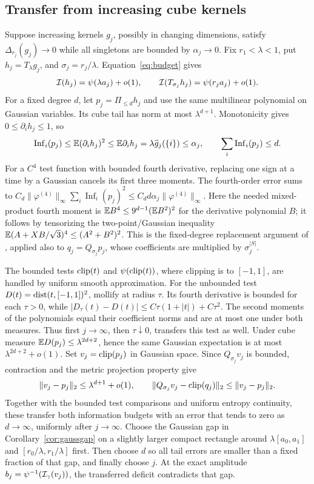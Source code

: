 \subsection{Transfer from increasing cube kernels}
Suppose increasing kernels $g_j$, possibly in changing dimensions,
satisfy $\Delta_{r_j}(g_j)\to0$ while all singletons are bounded by
$\alpha_j\to0$. Fix $r_1<\lambda<1$, put $h_j=T_\lambda g_j$,
and $\sigma_j=r_j/\lambda$. Equation~\eqref{eq:budget} gives
\[
 \mathcal I(h_j)=\psi(\lambda a_j)+o(1),\qquad
 \mathcal I(T_{\sigma_j}h_j)=\psi(r_ja_j)+o(1).
\]
For a fixed degree $d$, let $p_j=\Pi_{\le d}h_j$ and use the same
multilinear polynomial on Gaussian variables. Its cube tail has norm
at most $\lambda^{d+1}$.
Monotonicity gives $0\le\partial_i h_j\le1$, so
\[
 \operatorname{Inf}_i(p_j)\le\mathbb E(\partial_i h_j)^2
 \le\mathbb E\partial_i h_j=\lambda\widehat g_j(\{i\})\le\alpha_j,
 \qquad \sum_i\operatorname{Inf}_i(p_j)\le d.
\]
For a $C^4$ test function with bounded fourth derivative, replacing one
sign at a time by a Gaussian cancels its first three moments. The
fourth-order error sums to
$C_d\|\varphi^{(4)}\|_\infty\sum_i\operatorname{Inf}_i(p_j)^2
\le C_d d\alpha_j\|\varphi^{(4)}\|_\infty$.
Here the needed mixed-product fourth moment is
$\mathbb E B^4\le9^{d-1}(\mathbb E B^2)^2$ for the derivative polynomial $B$;
it follows by tensorizing the two-point/Gaussian inequality
$\mathbb E(A+XB/\sqrt3)^4\le(A^2+B^2)^2$.
This is the fixed-degree replacement argument of \cite{MOO}, applied
also to $q_j=Q_{\sigma_j}p_j$, whose coefficients are multiplied by
$\sigma_j^{|S|}$.

The bounded tests $\operatorname{clip}(t)$ and $\psi(\operatorname{clip}(t))$, where clipping is
to $[-1,1]$, are handled by uniform smooth approximation.
For the unbounded test $D(t)=\operatorname{dist}(t,[-1,1])^2$, mollify at radius
$\tau$. Its fourth derivative is bounded for each $\tau>0$, while
$|D_\tau(t)-D(t)|\le C\tau(1+|t|)+C\tau^2$.
The second moments of the polynomials equal their coefficient norms
and are at most one under both measures. Thus first $j\to\infty$,
then $\tau\downarrow0$, transfers this test as well.
Under cube measure $\mathbb E D(p_j)\le\lambda^{2d+2}$, hence the same
Gaussian expectation is at most $\lambda^{2d+2}+o(1)$.
Set $v_j=\operatorname{clip}(p_j)$ in Gaussian space. Since $Q_{\sigma_j}v_j$ is
bounded, contraction and the metric projection property give
\[
 \|v_j-p_j\|_2\le\lambda^{d+1}+o(1),\qquad
 \|Q_{\sigma_j}v_j-\operatorname{clip}(q_j)\|_2\le\|v_j-p_j\|_2.
\]
Together with the bounded test comparisons and uniform entropy
continuity, these transfer both information budgets with an error
that tends to zero as $d\to\infty$, uniformly after $j\to\infty$.
Choose the Gaussian gap in Corollary~\ref{cor:gaussgap} on a slightly
larger compact rectangle around $\lambda[a_0,a_1]$ and
$[r_0/\lambda,r_1/\lambda]$ first. Then choose $d$ so all tail errors
are smaller than a fixed fraction of that gap, and finally choose $j$.
At the exact amplitude $b_j=\psi^{-1}(\mathcal I_\gamma(v_j))$, the transferred
deficit contradicts that gap.

